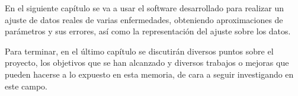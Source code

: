 En el siguiente capítulo se va a usar el software desarrollado para realizar un ajuste de datos reales de varias enfermedades, obteniendo aproximaciones de parámetros y sus errores, así como la representación del ajuste sobre los datos.

Para terminar, en el último capítulo se discutirán diversos puntos sobre el proyecto, los objetivos que se han alcanzado y diversos trabajos o mejoras que pueden hacerse a lo expuesto en esta memoria, de cara a seguir investigando en este campo.


